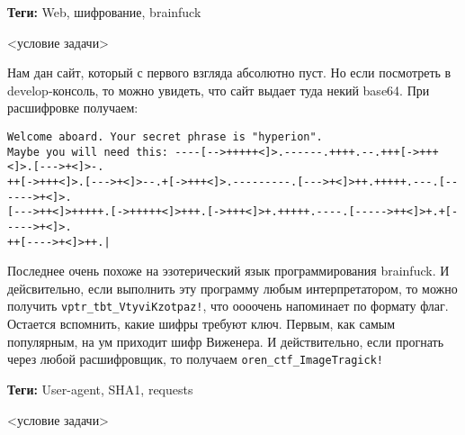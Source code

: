 \documentclass[idxtotoc,hyperref,openany,oneside]{files/admin} %
\begin{document}


\textbf{Теги:} Web, шифрование, brainfuck\vspace{\baselineskip}

\begin{tcolorbox}
<условие задачи>
\end{tcolorbox}

Нам дан сайт, который с первого взгляда абсолютно пуст. Но если посмотреть в develop-консоль, то можно увидеть, что сайт выдает туда некий base64. При расшифровке получаем:  \begin{verbatim}
Welcome aboard. Your secret phrase is "hyperion". 
Maybe you will need this: ----[-->+++++<]>.------.++++.--.+++[->+++<]>.[--->+<]>-.
++[->+++<]>.[--->+<]>--.+[->+++<]>.---------.[--->+<]>++.+++++.---.[------>+<]>.
[--->++<]>+++++.[->+++++<]>+++.[->+++<]>+.+++++.----.[----->++<]>+.+[----->+<]>.
++[---->+<]>++.|
\end{verbatim}

Последнее очень похоже на эзотерический язык программирования brainfuck. И дейсвительно, если выполнить эту программу любым интерпретатором, то можно получить \verb|vptr_tbt_VtyviKzotpaz!|, что оооочень напоминает по формату флаг. Остается вспомнить, какие шифры требуют ключ. Первым, как самым популярным, на ум приходит шифр Виженера. И действительно, если прогнать через любой расшифровщик, то получаем \verb|oren_ctf_ImageTragick!|




\textbf{Теги:} User-agent, SHA1, requests\vspace{\baselineskip}

\begin{tcolorbox}
<условие задачи>
\end{tcolorbox}
\end{document}

